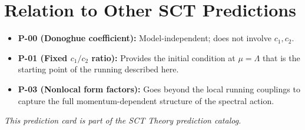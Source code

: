 \documentclass[11pt,a4paper]{article}
\begin{document}
\section{Relation to Other SCT Predictions}

\begin{itemize}[leftmargin=2em]
  \item \textbf{P-00 (Donoghue coefficient):} Model-independent; does not involve $c_1, c_2$.
  \item \textbf{P-01 (Fixed $c_1/c_2$ ratio):} Provides the initial condition at $\mu = \Lambda$ that is the starting point of the running described here.
  \item \textbf{P-03 (Nonlocal form factors):} Goes beyond the local running couplings to capture the full momentum-dependent structure of the spectral action.
\end{itemize}

\vspace{1em}
\noindent
\textit{This prediction card is part of the SCT Theory prediction catalog.}
\end{document}
